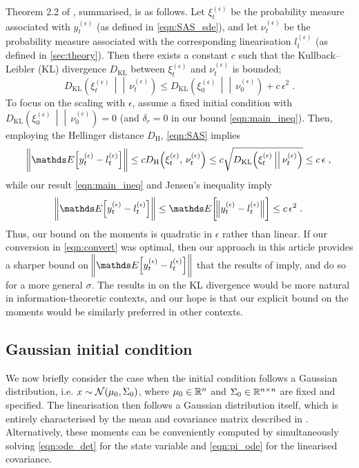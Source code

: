 Theorem 2.2 of \cite{Sanz-AlonsoStuart_2017_GaussianApproximationsSmall}, summarised, is as follows.
Let \(\xi_t^{(\epsilon)}\) be the probability measure associated with \(y_t^{(\epsilon)}\) (as defined in \cref{eqn:SAS_sde}), and let \(\nu_t^{(\epsilon)}\) be the probability measure associated with the corresponding linearisation \(l_t^{(\epsilon)}\) (as defined in \cref{sec:theory}).
Then there exists a constant \(c\) such that the Kullback--Leibler (KL) divergence \(D_{\mathrm{KL}}\) between \(\xi_t^{(\epsilon)}\) and \(\nu_t^{(\epsilon)}\) is bounded;
\begin{equation}
	\label{eqn:SAS}
	D_{\mathrm{KL}}\!\left(\xi_t^{(\epsilon)} \,\middle|\middle|\, \nu_t^{(\epsilon)}\right) \le D_{\mathrm{KL}}\!\left(\xi_0^{(\epsilon)} \,\middle|\middle|\, \nu_0^{(\epsilon)}\right) + c \, \epsilon^2\;.
\end{equation}
To focus on the scaling with \(\epsilon\), assume a fixed initial condition with \(D_{\mathrm{KL}}\!\left(\xi_0^{(\epsilon)} \,\middle|\middle|\, \nu_0^{(\epsilon)}\right) = 0\) (and \(\delta_r = 0\) in our bound \cref{eqn:main_ineq}). Then, employing the Hellinger distance \(D_{\mathrm{H}}\), \cref{eqn:SAS} implies
\begin{align}
	\label{eqn:convert}
	\norm{\avg{ y_t^{(\epsilon)} - l_t^{(\epsilon)}} } \le c D_{\mathrm{H}}\!\left(\xi_t^{(\epsilon)} ,\, \nu_t^{(\epsilon)}\right) \le c \sqrt{D_{\mathrm{KL}}\!\left(\xi_t^{(\epsilon)} \,\middle|\middle|\, \nu_t^{(\epsilon)}\right)} \le c \, \epsilon \;,
\end{align}
while our result \cref{eqn:main_ineq} and Jensen's inequality imply
\[
	\norm{\avg{ y_t^{(\epsilon)} - l_t^{(\epsilon)}} } \le \avg{\norm{y_t^{(\epsilon)} - l_t^{(\epsilon)}}} \leq c \, \epsilon^2\;.
\]
Thus, our bound on the moments is quadratic in \( \epsilon \) rather than linear.
If our conversion in \cref{eqn:convert} was optimal, then our approach in this article
provides a sharper bound on \(\norm{\avg{y_t^{(\epsilon)} - l_t^{(\epsilon)}}}\) that the
results of  \cite{Sanz-AlonsoStuart_2017_GaussianApproximationsSmall} imply, and do so for a
more general $ \sigma $.
The results in  \cite{Sanz-AlonsoStuart_2017_GaussianApproximationsSmall} on the KL divergence would be more natural in information-theoretic contexts, and our hope is that our explicit bound on the moments would be similarly preferred in other contexts.




\subsection{Gaussian initial condition}\label{sec:theory_gauss}
We now briefly consider the case when the initial condition follows a Gaussian distribution, i.e. \(x \sim\mathcal{N}\!\left(\mu_0, \Sigma_0\right)\), where \(\mu_0 \in \mathbb{R}^n\) and \(\Sigma_0 \in \mathbb{R}^{n \times n}\) are fixed and specified.
The linearisation then follows a Gaussian distribution itself, which is entirely characterised by the mean and covariance matrix described in .
Alternatively, these moments can be conveniently computed by simultaneously solving \cref{eqn:ode_det} for the state variable and \cref{eqn:pi_ode} for the linearised covariance.

